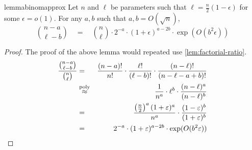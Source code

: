 \begin{restatable}{lemma}{binomapprox}\label{lem:binom-approx}
Let $n$ and $\ell$ be parameters such that $\ell = \frac{n}{2}(1 - \epsilon)$ for some $\epsilon = o(1)$. 
For any $a, b$ such that $a,b = O(\sqrt{n})$, 
\[
\binom{n - a}{\ell - b} \quad = \quad \binom{n}{\ell} \cdot 2^{-a} \cdot (1+\epsilon)^{a-2b} \cdot \exp(O(b^2\epsilon))
\]
\end{restatable}
\begin{proof}
The proof of the above lemma would repeated use \autoref{lem:factorial-ratio}. 
\begin{eqnarray*}
\frac{\binom{n-a}{\ell -b}}{\binom{n}{\ell}} & = & \frac{(n-a)!}{n!} \cdot \frac{\ell!}{(\ell -b)!}\cdot \frac{(n-\ell)!}{(n-\ell-a+b)!}\\
& \stackrel{\mathrm{poly}}{\approx}& \frac{1}{n^a} \cdot \ell^b \cdot \frac{(n-\ell)^a}{(n-\ell)^b}\\
& = & \frac{\left(\frac{n}{2}\right)^a(1 +\varepsilon)^a}{n^a} \cdot \frac{(1-\varepsilon)^{b}}{(1+\varepsilon)^b}\\
& = & 2^{-a} \cdot (1+\varepsilon)^{a - 2b} \cdot \exp(O(b^2 \varepsilon))
\end{eqnarray*}
\end{proof}


